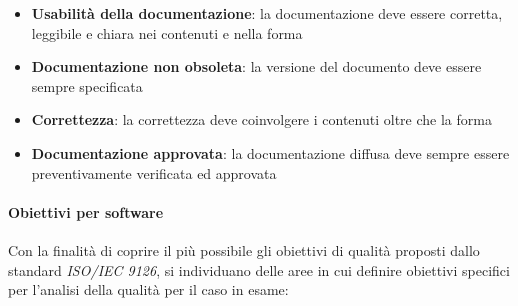 \documentclass[12pt,a4paper]{article}
\begin{document}
	\begin{itemize}
		\item\textbf{Usabilità della documentazione}: la documentazione deve essere corretta, leggibile e chiara nei contenuti e nella forma
		\item\textbf{Documentazione non obsoleta}: la versione del documento deve essere sempre specificata
		\item\textbf{Correttezza}: la correttezza deve coinvolgere i contenuti oltre che la forma
		\item\textbf{Documentazione approvata}: la documentazione diffusa deve sempre essere preventivamente verificata ed approvata
	\end{itemize}
	
	\paragraph{Obiettivi per software}
	Con la finalità di coprire il più possibile gli obiettivi di qualità proposti dallo standard \textit{ISO/IEC 9126}, si individuano delle aree in cui definire obiettivi specifici per l'analisi della qualità  per il caso in esame:
	
\end{document}
